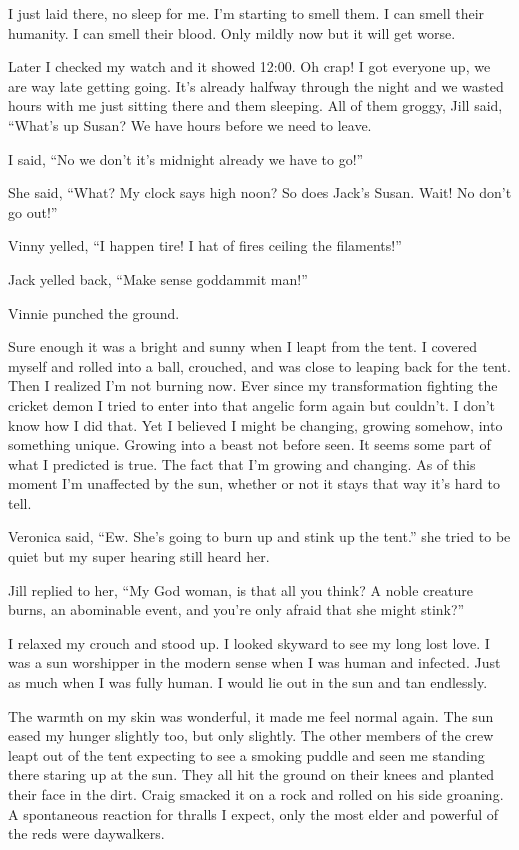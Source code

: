I just laid there, no sleep for me. I'm starting to smell them. I can smell their humanity. I can smell their blood. Only mildly now but it will get worse.

Later I checked my watch and it showed 12:00. Oh crap! I got everyone up, we are way late getting going. It's already halfway through the night and we wasted hours with me just sitting there and them sleeping. All of them groggy, Jill said, ``What's up Susan? We have hours before we need to leave.

I said, ``No we don't it's midnight already we have to go!''

She said, ``What? My clock says high noon? So does Jack's Susan. Wait! No don't go out!''

Vinny yelled, ``I happen tire! I hat of fires ceiling the filaments!''

Jack yelled back, ``Make sense goddammit man!''

Vinnie punched the ground.

Sure enough it was a bright and sunny when I leapt from the tent. I covered myself and rolled into a ball, crouched, and was close to leaping back for the tent. Then I realized I'm not burning now. Ever since my transformation fighting the cricket demon I tried to enter into that angelic form again but couldn't. I don't know how I did that. Yet I believed I might be changing, growing somehow, into something unique. Growing into a beast not before seen. It seems some part of what I predicted is true. The fact that I'm growing and changing. As of this moment I'm unaffected by the sun, whether or not it stays that way it's hard to tell.

Veronica said, ``Ew. She's going to burn up and stink up the tent.'' she tried to be quiet but my super hearing still heard her.

Jill replied to her, ``My God woman, is that all you think? A noble creature burns, an abominable event, and you're only afraid that she might stink?''

I relaxed my crouch and stood up. I looked skyward to see my long lost love. I was a sun worshipper in the  modern sense when I was human and infected. Just as much when I was fully human. I would lie out in the sun and tan endlessly. 

The warmth on my skin was wonderful, it made me feel normal again. The sun eased my hunger slightly too, but only slightly. The other members of the crew leapt out of the tent expecting to see a smoking puddle and seen me standing there staring up at the sun. They all hit the ground on their knees and planted their face in the dirt. Craig smacked it on a rock and rolled on his side groaning. A spontaneous reaction for thralls I expect, only the most elder and powerful of the reds were daywalkers.

